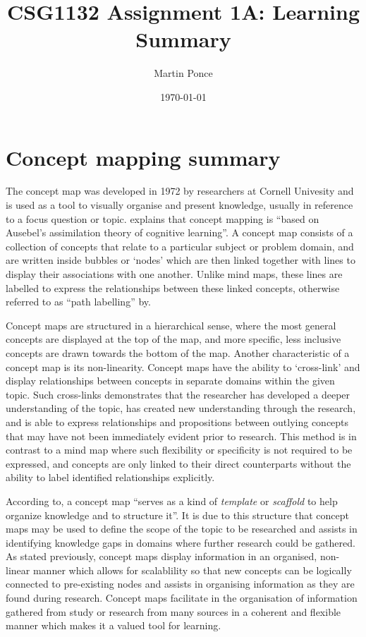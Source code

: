 \documentclass[a4paper, 12pt]{article}
\title{CSG1132 Assignment 1A: Learning Summary}
\author{Martin Ponce}
\date{\today}
\begin{document}
\maketitle

\section{Concept mapping summary}

The concept map was developed in 1972 by researchers at Cornell Univesity and is used as a tool to visually organise and present knowledge, usually in reference to a focus question or topic\citep*{Novak2006, Hilbert2009}. \citet[pp. 267]{Hilbert2009} explains that concept mapping is ``based on Ausebel's assimilation theory of cognitive learning''. A concept map consists of a collection of concepts that relate to a particular subject or problem domain, and are written inside bubbles or `nodes' which are then linked together with lines to display their associations with one another. Unlike mind maps, these lines are labelled to express the relationships between these linked concepts, otherwise referred to as ``path labelling'' by\citet[pp. 790]{Rodriguez-Priego2013}. 

Concept maps are structured in a hierarchical sense, where the most general concepts are displayed at the top of the map, and more specific, less inclusive concepts are drawn towards the bottom of the map\citep{Novak2006}. Another characteristic of a concept map is its non-linearity. Concept maps have the ability to `cross-link' and display relationships between concepts in separate domains within the given topic. Such cross-links demonstrates that the researcher has developed a deeper understanding of the topic, has created new understanding through the research, and is able to express relationships and propositions between outlying concepts that may have not been immediately evident prior to research\citep{Novak2006}. This method is in contrast to a mind map where such flexibility or specificity is not required to be expressed, and concepts are only linked to their direct counterparts without the ability to label identified relationships explicitly.

According to\citet[pp.1]{Novak2006}, a concept map ``serves as a kind of \textit{template} or \textit{scaffold} to help organize knowledge and to structure it''. It is due to this structure that concept maps may be used to define the scope of the topic to be researched and assists in identifying knowledge gaps in domains where further research could be gathered\citep{Novak2006}. As stated previously, concept maps display information in an organised, non-linear manner which allows for scalablility so that new concepts can be logically connected to pre-existing nodes and assists in organising information as they are found during research\citep{Novak2006}. Concept maps facilitate in the organisation of information gathered from study or research from many sources in a coherent and flexible manner which makes it a valued tool for learning.
\end{document}
